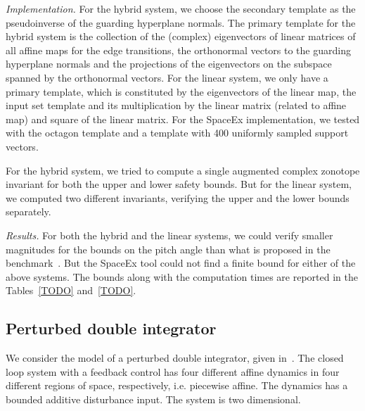 \emph{Implementation.}  For the hybrid system, we choose the secondary
template as the pseudoinverse of the guarding hyperplane normals.  The
primary template for the hybrid system is the collection of the
(complex) eigenvectors of linear matrices of all affine maps for the
edge transitions, the orthonormal vectors to the guarding hyperplane
normals and the projections of the eigenvectors on the subspace
spanned by the orthonormal vectors.  For the linear system, we only
have a primary template, which is constituted by the eigenvectors of
the linear map, the input set template and its multiplication by the
linear matrix (related to affine map) and square of the linear matrix.
For the SpaceEx implementation, we tested with the octagon template
and a template with 400 uniformly sampled support vectors.

For the hybrid system, we tried to compute a single augmented complex
zonotope invariant for both the upper and lower safety bounds.  But
for the linear system, we computed two different invariants, verifying
the upper and the lower bounds separately.

\emph{Results.}  For both the hybrid and the linear systems, we could
verify smaller magnitudes for the bounds on the pitch angle than what
is proposed in the benchmark~\cite{TODO}.  But the SpaceEx tool could
not find a finite bound for either of the above systems.  The bounds
along with the computation times are reported in the Tables~\ref{TODO}
and~\ref{TODO}.

%
\subsection{Perturbed double integrator}
We consider the model of a perturbed double integrator, given
in~\cite{TODO}.  The closed loop system with a feedback control has
four different affine dynamics in four different regions of space,
respectively, i.e. piecewise affine. The dynamics has a bounded
additive disturbance input.  The system is two dimensional.

